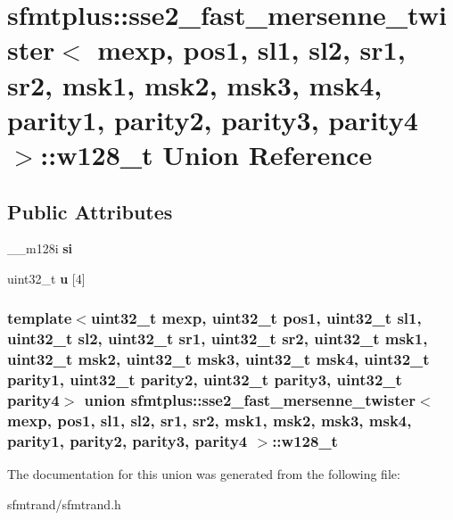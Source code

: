 \hypertarget{unionsfmtplus_1_1sse2__fast__mersenne__twister_1_1w128__t}{
\section{sfmtplus\-:\-:sse2\-\_\-fast\-\_\-mersenne\-\_\-twister$<$ mexp, pos1, sl1, sl2, sr1, sr2, msk1, msk2, msk3, msk4, parity1, parity2, parity3, parity4 $>$\-:\-:w128\-\_\-t \-Union \-Reference}
\label{unionsfmtplus_1_1sse2__fast__mersenne__twister_1_1w128__t}
}
\subsection*{\-Public \-Attributes}
\begin{DoxyCompactItemize}
\item 
\hypertarget{unionsfmtplus_1_1sse2__fast__mersenne__twister_1_1w128__t_a9f3608589d655154caac86904f4ed67a}{
\-\_\-\-\_\-m128i {\bfseries si}}
\label{unionsfmtplus_1_1sse2__fast__mersenne__twister_1_1w128__t_a9f3608589d655154caac86904f4ed67a}

\item 
\hypertarget{unionsfmtplus_1_1sse2__fast__mersenne__twister_1_1w128__t_a5008e19126ebe898538c431e635183d7}{
uint32\-\_\-t {\bfseries u} \mbox{[}4\mbox{]}}
\label{unionsfmtplus_1_1sse2__fast__mersenne__twister_1_1w128__t_a5008e19126ebe898538c431e635183d7}

\end{DoxyCompactItemize}
\subsubsection*{template$<$uint32\-\_\-t mexp, uint32\-\_\-t pos1, uint32\-\_\-t sl1, uint32\-\_\-t sl2, uint32\-\_\-t sr1, uint32\-\_\-t sr2, uint32\-\_\-t msk1, uint32\-\_\-t msk2, uint32\-\_\-t msk3, uint32\-\_\-t msk4, uint32\-\_\-t parity1, uint32\-\_\-t parity2, uint32\-\_\-t parity3, uint32\-\_\-t parity4$>$ union sfmtplus\-::sse2\-\_\-fast\-\_\-mersenne\-\_\-twister$<$ mexp, pos1, sl1, sl2, sr1, sr2, msk1, msk2, msk3, msk4, parity1, parity2, parity3, parity4 $>$\-::w128\-\_\-t}



\-The documentation for this union was generated from the following file\-:\begin{DoxyCompactItemize}
\item 
sfmtrand/sfmtrand.\-h\end{DoxyCompactItemize}
